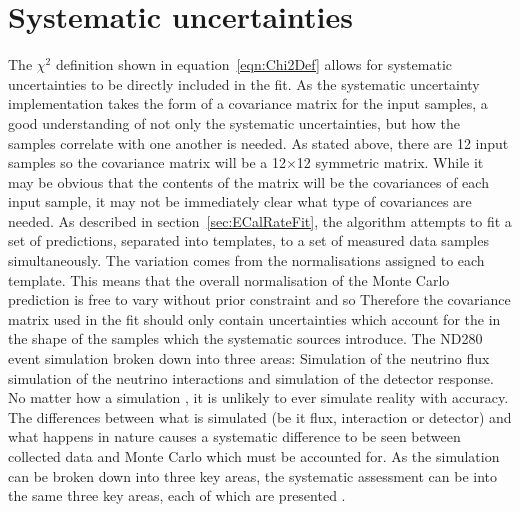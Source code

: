 \section{Systematic uncertainties}
\label{sec:SystematicUncertainties}
The $\chi^2$ definition shown in equation~\ref{eqn:Chi2Def} allows for systematic uncertainties to be directly included in the fit.  As the systematic uncertainty implementation takes the form of a covariance matrix for the input samples, a good understanding of not only the systematic uncertainties, but how the samples correlate with one another is needed.  
\newline
\newline
As stated above, there are 12 input samples so the covariance matrix will be a 12$\times$12 symmetric matrix.  While it may be obvious that the contents of the matrix will be the covariances of each input sample, it may not be immediately clear what type of covariances are needed.  As described in section~\ref{sec:ECalRateFit}, the algorithm attempts to fit a set of predictions, separated into templates, to a set of measured data samples simultaneously.  The variation comes from the normalisations assigned to each template.  This means that the overall normalisation of the Monte Carlo prediction is free to vary without prior constraint and so  Therefore the covariance matrix used in the fit should only contain uncertainties which account for the  in the shape of the samples which the systematic sources introduce.
\newline
\newline
The ND280 event simulation  broken down into three areas: Simulation of the neutrino flux simulation of the neutrino interactions and simulation of the detector response.  No matter how  a simulation , it is unlikely to ever simulate reality with  accuracy.  The differences between what is simulated (be it flux, interaction or detector) and what happens in nature causes a systematic difference to be seen between collected data and Monte Carlo which must be accounted for.  As the simulation can be broken down into three key areas, the systematic assessment can be  into the same three key areas, each of which are presented .  
